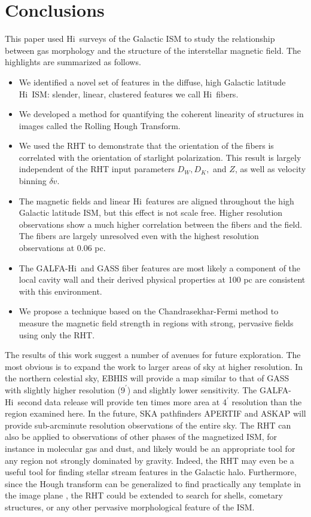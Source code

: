 \documentclass[12pt]{emulateapj}
\newcommand{\hi}{H{\sc i}~}
\begin{document}
\section{Conclusions}\label{conclusion}

This paper used \hi surveys of the Galactic ISM to study the relationship between gas morphology and the structure of the interstellar magnetic field. The highlights are summarized as follows.
\begin{itemize}
\item{We identified a novel set of features in the diffuse, high Galactic latitude \hi ISM: slender, linear, clustered features we call \hi fibers.}
\item{We developed a method for quantifying the coherent linearity of structures in images called the Rolling Hough Transform. }
\item{We used the RHT to demonstrate that the orientation of the fibers is correlated with the orientation of starlight polarization. This result is largely independent of the RHT input parameters $D_W, D_K,$ and $Z$, as well as velocity binning $\delta v$.}
\item{The magnetic fields and linear \hi features are aligned throughout the high Galactic latitude ISM, but this effect is not scale free.  Higher resolution observations show a much higher correlation between the fibers and the field.  The fibers are largely unresolved even with the highest resolution observations at 0.06 pc.}
\item{The GALFA-\hi and GASS fiber features are most likely a component of the local cavity wall and their derived physical properties at 100 pc are consistent with this environment.}
\item{We propose a technique based on the Chandrasekhar-Fermi method to measure the magnetic field strength in regions with strong, pervasive fields using only the RHT.}
\end{itemize}

The results of this work suggest a number of avenues for future exploration. The most obvious is to expand the work to larger areas of sky at higher resolution. In the northern celestial sky, EBHIS \citep{Kerp:2011ga} will provide a map similar to that of GASS with slightly higher resolution ($9^\prime$) and slightly lower sensitivity. The GALFA-\hi second data release will provide ten times more area at 4$^\prime$ resolution than the region examined here. In the future, SKA pathfinders APERTIF \citep{Verheijen:2009ua} and ASKAP \citep{Duffy:2012ie, 2012arXiv1207.0891D} will provide sub-arcminute resolution observations of the entire sky. The RHT can also be applied to observations of other phases of the magnetized ISM, for instance in molecular gas and dust, and likely would be an appropriate tool for any region not strongly dominated by gravity. Indeed, the RHT may even be a useful tool for finding stellar stream features in the Galactic halo. Furthermore, since the Hough transform can be generalized to find practically any template in the image plane \citep{Duda:1972uj}, the RHT could be extended to search for shells, cometary structures, or any other pervasive morphological feature of the ISM.
\end{document}
